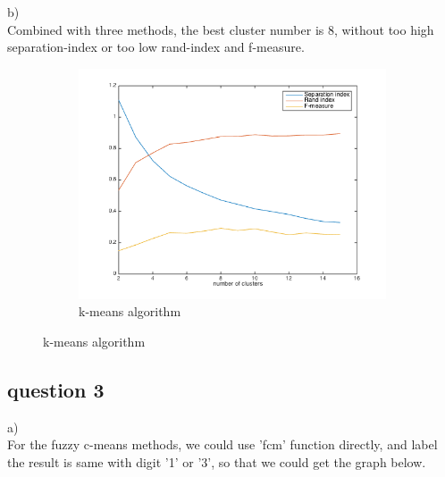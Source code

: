 \documentclass[]{article}
\begin{document}
b) \\

Combined with three methods, the best cluster number is 8, without too high separation-index or too low rand-index and f-measure.


\begin{figure}[p]
	\centering
	\begin{subfigure}{.5\textwidth}
		\centering
		\includegraphics[width=1\linewidth]{../images-update/2-(2)-3.png}
		\caption{k-means algorithm}
		\label{fig:sub1}
	\end{subfigure}
	
	
	
\end{figure}



\subsection{question 3}


a)\\

For the fuzzy c-means methods, we could use 'fcm' function directly, and label the result is same with digit '1' or '3', so that we could get the graph below.
\end{document}
